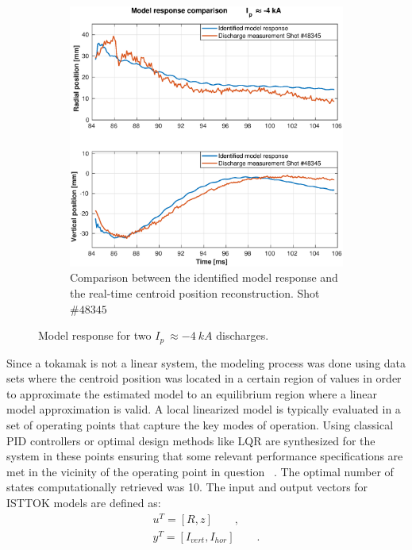 \begin{figure}
\begin{subfigure}[b]{0.55\textwidth}
		\includegraphics[width=\textwidth]{Chp5/SimResp_345.eps}        
		\caption{ Comparison between the  identified model response and the real-time centroid position reconstruction. Shot $\#48345 $ \label{SimResp345}}
	\end{subfigure}
	\caption{ Model response for two $I_p~\approx -4~kA$ discharges. \label{SimResp_neg}}
\end{figure}

Since a tokamak is not a linear system, the modeling process was done using data sets where the centroid position was located in a certain region of values in order to approximate the estimated  model to an equilibrium region where a linear model approximation is valid. A local linearized model is typically evaluated in a  set of operating points that capture the key modes of operation. Using classical PID controllers or  optimal design methods like LQR are synthesized for the system in these points ensuring that some relevant performance specifications are met in the vicinity of the operating point in question ~\cite{Bendtsen2005}. The optimal number of states computationally retrieved was  10. The input and output vectors for ISTTOK models are defined as:
\begin{equation}
\begin{aligned}
u^T=[R, z]\qquad, \\
y^T=[I_{vert},I_{hor}]\qquad .
\end{aligned} 
\end{equation}



